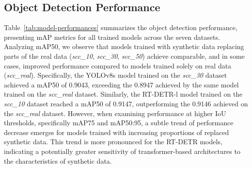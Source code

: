 \subsection{Object Detection Performance}
\label{subsec:object-detection-performance}
Table~\ref{tab:model-performances} summarizes the object detection performance, presenting mAP metrics for all trained models across the seven datasets.
Analyzing mAP\@50, we observe that models trained with synthetic data replacing parts of the real data (\textit{scc\_10}, \textit{scc\_30}, \textit{scc\_50}) achieve comparable, and in some cases, improved performance compared to models trained solely on real data (\textit{scc\_real}).
Specifically, the YOLOv8s model trained on the \textit{scc\_30} dataset achieved a mAP\@50 of 0.9043, exceeding the 0.8947 achieved by the same model trained on the \textit{scc\_real} dataset.
Similarly, the RT-DETR-l model trained on the \textit{scc\_10} dataset reached a mAP\@50 of 0.9147, outperforming the 0.9146 achieved on the \textit{scc\_real} dataset.
However, when examining performance at higher IoU thresholds, specifically mAP\@75 and mAP\@50:95, a subtle trend of performance decrease emerges for models trained with increasing proportions of replaced synthetic data.
This trend is more pronounced for the RT-DETR models, indicating a potentially greater sensitivity of transformer-based architectures to the characteristics of synthetic data.

